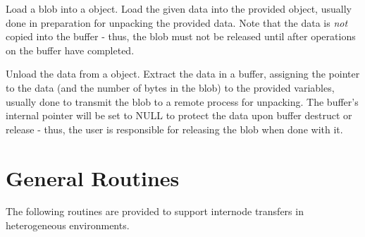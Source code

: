 
Load a blob into a  object.
Load the given data into the provided  object, usually done in preparation for unpacking the provided data. Note that the data is \textit{not} copied into the buffer - thus, the blob must not be released until after operations on the buffer have completed.


\begin{arglist}
\end{arglist}


Unload the data from a  object.
Extract the data in a buffer, assigning the pointer to the data (and the number of bytes in the blob) to the provided variables, usually done to transmit the blob to a remote process for unpacking. The buffer's internal pointer will be set to NULL to protect the data upon buffer destruct or release - thus, the user is responsible for releasing the blob when done with it.


\begin{arglist}
\end{arglist}


\section{General Routines}
\label{chap:data_mgmt:general}

The following routines are provided to support internode transfers in heterogeneous environments.

